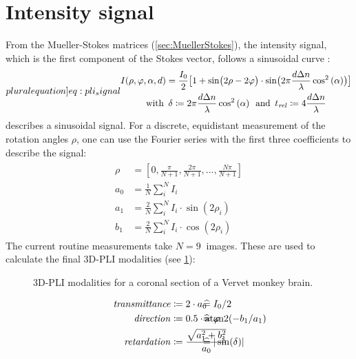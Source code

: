 \section{Intensity signal}\label{sec::intSignal}
%
From the Mueller-Stokes matrices (\cref{sec:MuellerStokes}), the intensity signal, which is the first component of the Stokes vector, follows a sinusoidal curve \cite{MenzelMaster,MenzelDissertation}:
%
\begin{align}
\label[pluralequation]{eq:pli_signal}
\centering
\begin{gathered}
I(\rho, \varphi, \alpha, d) =\frac{I_0}{2}\bigl[ 1+ \sin\bigl(2\rho - 2\varphi \bigr)\cdot \sin \bigl( 2\pi\frac{d \dn}{\lambda} \cos^2\left( \alpha \right) \bigr) \bigr] \\
\text{with} \enspace \delta \coloneqq 2\pi\frac{d \dn}{\lambda} \cos^2\left( \alpha \right) \enspace
\text{and} \enspace \trel \coloneqq 4 \frac{d \dn}{\lambda}
\end{gathered}
\end{align}
%
 describes a sinusoidal signal.
For a discrete, equidistant measurement of the rotation angles $\rho$, one can use the Fourier series with the first three coefficients to describe the signal:
%
\begin{align}
\begin{split}
\rho &= [0, \frac{\pi}{N+1}, \frac{2\pi}{N+1}, ..., \frac{N\pi}{N+1}]\\
a_0 &= \frac{1}{N} \sum_i^N I_i\\
a_1 &= \frac{2}{N} \sum_i^N I_i \cdot \sin(2 \rho_i)\\
b_1 &= \frac{2}{N} \sum_i^N I_i \cdot \cos(2 \rho_i)
\end{split}
\end{align}
%
The current routine measurements take $N=\SI{9}{}$ images.
These are used to calculate the final \ac{3D-PLI} modalities (see \cref{fig:vervetpli}):
%
\begin{figure}[!t]

\caption[3D-PLI modalities]{3D-PLI modalities for a coronal section of a Vervet monkey brain.}
\label{fig:vervetpli}
\end{figure}
%
\begin{align}
\begin{split}
\mathit{transmittance} &\coloneqq 2 \cdot a_0 \vphantom{I_0/2} \\
\mathit{direction} &\coloneqq 0.5 \cdot \atantwo(-b_1 / a_1) \vphantom{\varphi} \\
\mathit{retardation} &\coloneqq \frac{\sqrt{a_1^2 + b_1^2}}{a_0}  \vphantom{\sin(\delta)}
\end{split}
\hspace{-7em}
\begin{split}
& \mathrel{\widehat{=}} I_0/2 \vphantom{2 \cdot a_0}\\
& \mathrel{\widehat{=}} \varphi \vphantom{0.5 \cdot \atantwo(-b_1 / a_1)} \\
& \mathrel{\widehat{=}} |\sin(\delta)| \vphantom{\frac{\sqrt{a_1^2 + b_1^2}}{a_0}}
\end{split}
\end{align}

